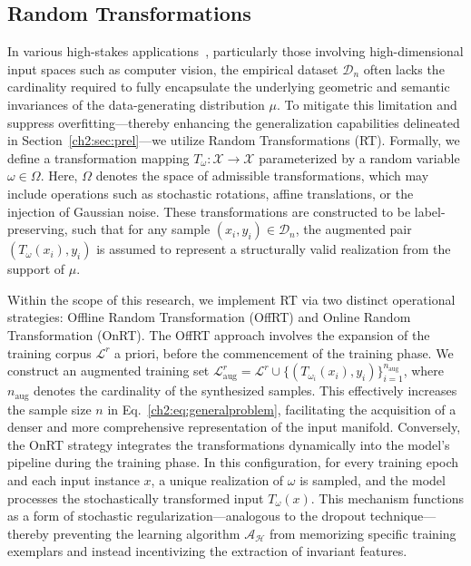 \subsection{Random Transformations}
\label{ch2:sec:RT}
In various high-stakes applications~\citep{shorten2019survey}, particularly those involving high-dimensional input spaces such as computer vision, the empirical dataset $\mathcal{D}_n$ often lacks the cardinality required to fully encapsulate the underlying geometric and semantic invariances of the data-generating distribution $\mu$. 
To mitigate this limitation and suppress overfitting—thereby enhancing the generalization capabilities delineated in Section~\ref{ch2:sec:prel}—we utilize Random Transformations (RT).
Formally, we define a transformation mapping $T_\omega: \mathcal{X} \rightarrow \mathcal{X}$ parameterized by a random variable $\omega \in \Omega$. 
Here, $\Omega$ denotes the space of admissible transformations, which may include operations such as stochastic rotations, affine translations, or the injection of Gaussian noise. 
These transformations are constructed to be label-preserving, such that for any sample $(x_i, y_i) \in \mathcal{D}_n$, the augmented pair $(T_\omega(x_i), y_i)$ is assumed to represent a structurally valid realization from the support of $\mu$.

Within the scope of this research, we implement RT via two distinct operational strategies: Offline Random Transformation (OffRT) and Online Random Transformation (OnRT).
The OffRT approach involves the expansion of the training corpus $\mathcal{L}^r$ a priori, before the commencement of the training phase. 
We construct an augmented training set $\mathcal{L}^r_{\text{aug}} = \mathcal{L}^r \cup \{ (T_{\omega_i}(x_i), y_i) \}_{i=1}^{n_{\text{aug}}}$, where $n_{\text{aug}}$ denotes the cardinality of the synthesized samples. 
This effectively increases the sample size $n$ in Eq.~\eqref{ch2:eq:generalproblem}, facilitating the acquisition of a denser and more comprehensive representation of the input manifold.
Conversely, the OnRT strategy integrates the transformations dynamically into the model’s pipeline during the training phase. 
In this configuration, for every training epoch and each input instance $x$, a unique realization of $\omega$ is sampled, and the model processes the stochastically transformed input $T_\omega(x)$. 
This mechanism functions as a form of stochastic regularization—analogous to the dropout technique—thereby preventing the learning algorithm $\mathscr{A}_\mathcal{H}$ from memorizing specific training exemplars and instead incentivizing the extraction of invariant features.

